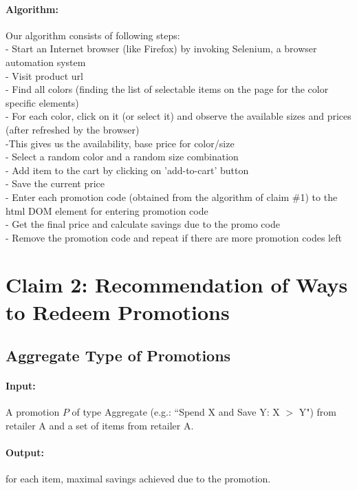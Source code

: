\documentclass[11pt]{article}
\begin{document}
\paragraph{Algorithm:} Our algorithm consists of following steps:\\
- Start an Internet browser (like Firefox) by invoking Selenium, a browser automation system\\
- Visit product url\\
- Find all colors (finding the list of selectable items on the page for the color specific elements)\\
- For each color, click on it (or select it) and observe the available sizes and prices (after refreshed by the browser)\\
       			-This gives us the {availability, base price} for color/size\\
   		- Select a random color and a random size combination\\ 
       		- Add item to the cart by clicking on 'add-to-cart' button\\
   		- Save the current price\\
       		- Enter each promotion code (obtained from the algorithm of claim \#1) to the html DOM element for entering promotion code\\
   	     	- Get the final price and calculate savings due to the promo code\\
		- Remove the promotion code and repeat if there are more promotion codes left


\section{Claim 2: Recommendation of Ways to Redeem Promotions}

\subsection{Aggregate Type of Promotions}
\paragraph{Input:} A promotion $P$ of type Aggregate (e.g.: ``Spend X and Save Y: X $>$ Y") from retailer A and a set of items from retailer A.

\paragraph{Output:} for each item, maximal savings achieved due to the promotion.\\
\end{document}
